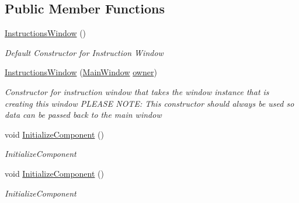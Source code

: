 \subsection*{Public Member Functions}
\begin{DoxyCompactItemize}
\item 
\hyperlink{class_c_p_u___o_s___simulator_1_1_instructions_window_aa482ef12f9c98458bedcc3c07d696879}{Instructions\+Window} ()
\begin{DoxyCompactList}\small\item\em Default Constructor for Instruction Window \end{DoxyCompactList}\item 
\hyperlink{class_c_p_u___o_s___simulator_1_1_instructions_window_a5ed238dc308dcc976400105a3973deb0}{Instructions\+Window} (\hyperlink{class_c_p_u___o_s___simulator_1_1_main_window}{Main\+Window} \hyperlink{class_c_p_u___o_s___simulator_1_1_instructions_window_a954c950c677c61a3b7ed7406b6dc7164}{owner})
\begin{DoxyCompactList}\small\item\em Constructor for instruction window that takes the window instance that is creating this window P\+L\+E\+A\+S\+E N\+O\+T\+E\+: This constructor should always be used so data can be passed back to the main window \end{DoxyCompactList}\item 
void \hyperlink{class_c_p_u___o_s___simulator_1_1_instructions_window_a8ad79899f3d5210d66fb5973b721895a}{Initialize\+Component} ()
\begin{DoxyCompactList}\small\item\em Initialize\+Component \end{DoxyCompactList}\item 
void \hyperlink{class_c_p_u___o_s___simulator_1_1_instructions_window_a8ad79899f3d5210d66fb5973b721895a}{Initialize\+Component} ()
\begin{DoxyCompactList}\small\item\em Initialize\+Component \end{DoxyCompactList}\end{DoxyCompactItemize}

